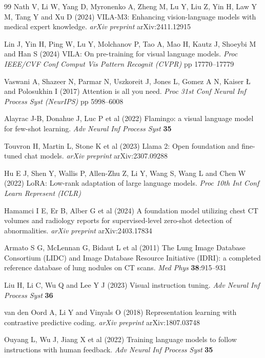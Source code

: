 \documentclass[lineno,referee,pdflatex,sn-mathphys-num]{sn-jnl}
\begin{document}
\begin{thebibliography}{99}
Nath V, Li W, Yang D, Myronenko A, Zheng M, Lu Y, Liu Z, Yin H,
Law Y M, Tang Y and Xu D (2024)
VILA-M3: Enhancing vision-language models with medical expert knowledge.
\textit{arXiv preprint} arXiv:2411.12915

Lin J, Yin H, Ping W, Lu Y, Molchanov P, Tao A, Mao H, Kautz J,
Shoeybi M and Han S (2024)
VILA: On pre-training for visual language models.
\textit{Proc IEEE/CVF Conf Comput Vis Pattern Recognit (CVPR)} pp 17770--17779

Vaswani A, Shazeer N, Parmar N, Uszkoreit J, Jones L, Gomez A N,
Kaiser {\L} and Polosukhin I (2017)
Attention is all you need.
\textit{Proc 31st Conf Neural Inf Process Syst (NeurIPS)} pp 5998--6008

Alayrac J-B, Donahue J, Luc P et al (2022)
Flamingo: a visual language model for few-shot learning.
\textit{Adv Neural Inf Process Syst} \textbf{35}

Touvron H, Martin L, Stone K et al (2023)
Llama 2: Open foundation and fine-tuned chat models.
\textit{arXiv preprint} arXiv:2307.09288

Hu E J, Shen Y, Wallis P, Allen-Zhu Z, Li Y, Wang S, Wang L and
Chen W (2022)
LoRA: Low-rank adaptation of large language models.
\textit{Proc 10th Int Conf Learn Represent (ICLR)}

Hamamci I E, Er B, Alber G et al (2024)
A foundation model utilizing chest CT volumes and radiology reports for
supervised-level zero-shot detection of abnormalities.
\textit{arXiv preprint} arXiv:2403.17834

Armato S G, McLennan G, Bidaut L et al (2011)
The Lung Image Database Consortium (LIDC) and Image Database Resource
Initiative (IDRI): a completed reference database of lung nodules on
CT scans.
\textit{Med Phys} \textbf{38}:915--931

Liu H, Li C, Wu Q and Lee Y J (2023)
Visual instruction tuning.
\textit{Adv Neural Inf Process Syst} \textbf{36}

van den Oord A, Li Y and Vinyals O (2018)
Representation learning with contrastive predictive coding.
\textit{arXiv preprint} arXiv:1807.03748

Ouyang L, Wu J, Jiang X et al (2022)
Training language models to follow instructions with human feedback.
\textit{Adv Neural Inf Process Syst} \textbf{35}


\end{thebibliography}
\end{document}
